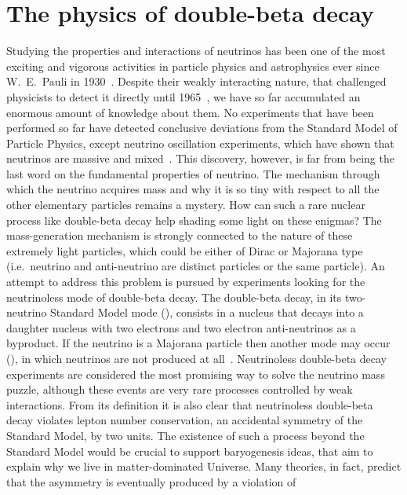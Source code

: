 
\chapter{The physics of double-beta decay}\label{chap:theory}

Studying the properties and interactions of neutrinos has been one of the most exciting
and vigorous activities in particle physics and astrophysics ever since W.~E.~Pauli in
1930~\cite{Brown1978}. Despite their weakly interacting nature, that challenged physicists
to detect it directly until 1965~\cite{Cowan1956}, we have so far accumulated an enormous
amount of knowledge about them. No experiments that have been performed so far have
detected conclusive deviations from the Standard Model of Particle Physics, except
neutrino oscillation experiments, which have shown that neutrinos are massive and
mixed~\cite{Fukuda1998, Ahmad2002, Eguchi2003, Kajita2016, McDonald2016}.  This discovery,
however, is far from being the last word on the fundamental properties of neutrino. The
mechanism through which the neutrino acquires mass and why it is so tiny with respect to
all the other elementary particles remains a mystery. How can such a rare nuclear process
like double-beta decay help shading some light on these enigmas?
\newpar
The mass-generation mechanism is strongly connected to the nature of these extremely light
particles, which could be either of Dirac or Majorana type (i.e.~neutrino and
anti-neutrino are distinct particles or the same particle). An attempt to address this
problem is pursued by experiments looking for the neutrinoless mode of double-beta decay.
The double-beta decay, in its two-neutrino Standard Model mode (\nnbb), consists in a
nucleus that decays into a daughter nucleus with two electrons and two electron
anti-neutrinos as a byproduct. If the neutrino is a Majorana particle then another mode
may occur (\onbb), in which neutrinos are not produced at all~\cite{Schechter1982}.
Neutrinoless double-beta decay experiments are considered the most promising way to solve
the neutrino mass puzzle, although these events are very rare processes controlled by weak
interactions.
\newpar
From its definition it is also clear that neutrinoless double-beta decay violates lepton
number conservation, an accidental symmetry of the Standard Model, by two units. The
existence of such a process beyond the Standard Model would be crucial to support
baryogenesis ideas, that aim to explain why we live in matter-dominated Universe.  Many
theories, in fact, predict that the asymmetry is eventually produced by a violation of
